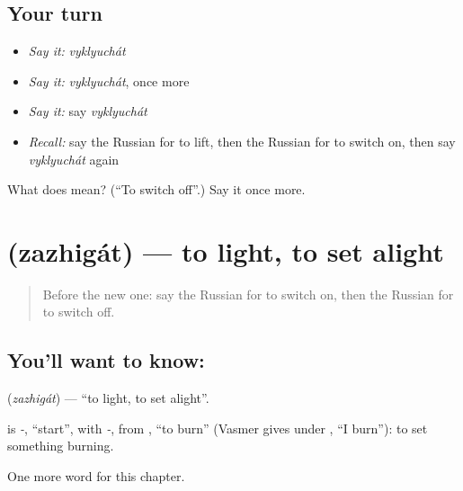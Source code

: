 \subsection*{Your turn}
\begin{itemize}
\raggedright
  \item \emph{Say it:} \emph{vyklyuchát}
  \item \emph{Say it:} \emph{vyklyuchát}, once more
  \item \emph{Say it:} say \emph{vyklyuchát}
  \item \emph{Recall:} say the Russian for to lift, then the Russian for to switch on, then say \emph{vyklyuchát} again
\end{itemize}

\begin{tcolorbox}[breakable,colback=teal!4,colframe=teal!35!black,title={Before you move on}]
What does  mean? (\textquotedblleft{}To switch off\textquotedblright{}.) Say it once more.
\end{tcolorbox}
\section[\texorpdfstring{\ru{зажигать} (zazhigát)}{зажигать (zazhigát)}]{ (zazhigát) — to light, to set alight}

\label{lesson:RU-C175-zazhigat}



\begin{quote}
Before the new one: say the Russian for to switch on, then the Russian for to switch off.
\end{quote}

\subsection*{You'll want to know: }
\textbf{} (\emph{zazhigát}) — \textquotedblleft{}to light, to set alight\textquotedblright{}.

\begin{cousinweb}
\textbf{} is \emph{-}, \textquotedblleft{}start\textquotedblright{}, with \emph{-}, from \emph{}, \textquotedblleft{}to burn\textquotedblright{} (Vasmer gives \emph{} under \emph{}, \textquotedblleft{}I burn\textquotedblright{}): to set something burning.
\end{cousinweb}

\begin{grammarlens}[title={What you've built}]
One more word for this chapter.
\end{grammarlens}

